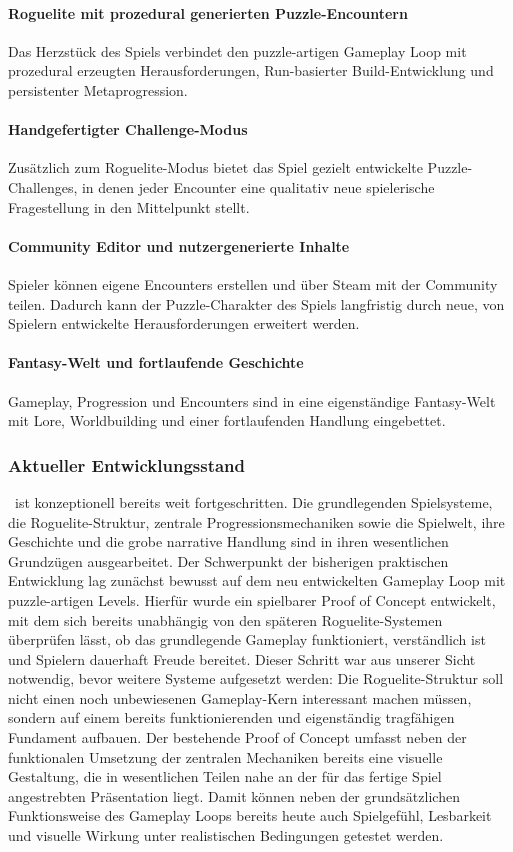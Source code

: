 \paragraph{Roguelite mit prozedural generierten Puzzle-Encountern}
Das Herzstück des Spiels verbindet den puzzle-artigen Gameplay Loop mit prozedural erzeugten Herausforderungen, Run-basierter Build-Entwicklung und persistenter Metaprogression.

\paragraph{Handgefertigter Challenge-Modus}
Zusätzlich zum Roguelite-Modus bietet das Spiel gezielt entwickelte Puzzle-Challenges, in denen jeder Encounter eine qualitativ neue spielerische Fragestellung in den Mittelpunkt stellt.

\paragraph{Community Editor und nutzergenerierte Inhalte}
Spieler können eigene Encounters erstellen und über Steam mit der Community teilen. Dadurch kann der Puzzle-Charakter des Spiels langfristig durch neue, von Spielern entwickelte Herausforderungen erweitert werden.

\paragraph{Fantasy-Welt und fortlaufende Geschichte}
Gameplay, Progression und Encounters sind in eine eigenständige Fantasy-Welt mit Lore, Worldbuilding und einer fortlaufenden Handlung eingebettet.

\subsubsection{Aktueller Entwicklungsstand}
\coc\ ist konzeptionell bereits weit fortgeschritten.
Die grundlegenden Spielsysteme, die Roguelite-Struktur, zentrale Progressionsmechaniken sowie die Spielwelt, ihre Geschichte und die grobe narrative Handlung sind in ihren wesentlichen Grundzügen ausgearbeitet.
Der Schwerpunkt der bisherigen praktischen Entwicklung lag zunächst bewusst auf dem neu entwickelten Gameplay Loop mit puzzle-artigen Levels.
Hierfür wurde ein spielbarer Proof of Concept entwickelt, mit dem sich bereits unabhängig von den späteren Roguelite-Systemen überprüfen lässt, ob das grundlegende Gameplay funktioniert, verständlich ist und Spielern dauerhaft Freude bereitet.
Dieser Schritt war aus unserer Sicht notwendig, bevor weitere Systeme aufgesetzt werden: Die Roguelite-Struktur soll nicht einen noch unbewiesenen Gameplay-Kern interessant machen müssen, sondern auf einem bereits funktionierenden und eigenständig tragfähigen Fundament aufbauen.
Der bestehende Proof of Concept umfasst neben der funktionalen Umsetzung der zentralen Mechaniken bereits eine visuelle Gestaltung, die in wesentlichen Teilen nahe an der für das fertige Spiel angestrebten Präsentation liegt. Damit können neben der grundsätzlichen Funktionsweise des Gameplay Loops bereits heute auch Spielgefühl, Lesbarkeit und visuelle Wirkung unter realistischen Bedingungen getestet werden.

